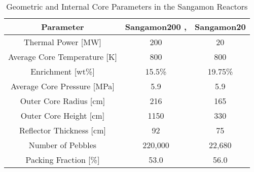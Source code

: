 \begin{table}[h!]
\centering
\caption{Geometric and Internal Core Parameters in the Sangamon Reactors}
\begin{tabular}{ c  c  c }
\hline
Parameter & Sangamon200 \cite{harlan_x-energy_2018}, \cite{harlan_ans_2017} & Sangamon20 \\
\hline
Thermal Power [MW] & 200 & 20 \\
Average Core Temperature [K] & 800 & 800 \\
Enrichment [wt\%] & 15.5\% & 19.75\% \\
Average Core Pressure [MPa] & 5.9 & 5.9 \\
Outer Core Radius [cm] & 216 & 165 \\
Outer Core Height [cm] & 1150 & 330 \\
Reflector Thickness [cm] & 92 & 75 \\
Number of Pebbles & 220,000 & 22,680 \\
Packing Fraction [\%] & 53.0 & 56.0 \\
\hline
\end{tabular}

\label{table:params1}
\end{table}